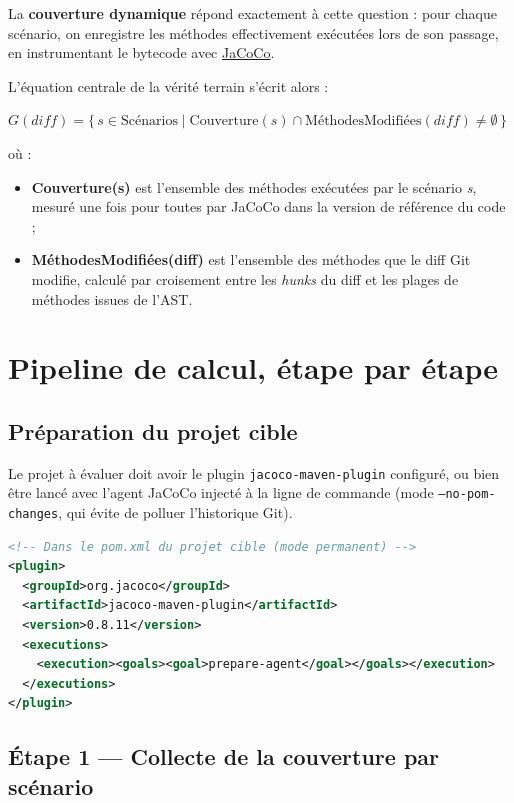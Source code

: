 \documentclass[11pt,a4paper]{article}
\begin{document}
La \textbf{couverture dynamique} répond exactement à cette question : pour chaque scénario, on enregistre les méthodes effectivement exécutées lors de son passage, en instrumentant le bytecode avec \href{https://www.jacoco.org/}{JaCoCo}.

L'équation centrale de la vérité terrain s'écrit alors :

\begin{formulabox}
$G(\mathit{diff}) = \{\, s \in \text{Scénarios} \mid \text{Couverture}(s) \cap \text{MéthodesModifiées}(\mathit{diff}) \neq \emptyset \,\}$
\end{formulabox}

\noindent où :
\begin{itemize}
  \item \textbf{Couverture(s)} est l'ensemble des méthodes exécutées par le scénario \emph{s}, mesuré une fois pour toutes par JaCoCo dans la version de référence du code ;
  \item \textbf{MéthodesModifiées(diff)} est l'ensemble des méthodes que le diff Git modifie, calculé par croisement entre les \emph{hunks} du diff et les plages de méthodes issues de l'AST.
\end{itemize}


\section{Pipeline de calcul, étape par étape}
\label{sec:pipeline}

\subsection{Préparation du projet cible}

Le projet à évaluer doit avoir le plugin \texttt{jacoco-maven-plugin} configuré, ou bien être lancé avec l'agent JaCoCo injecté à la ligne de commande (mode \texttt{--no-pom-changes}, qui évite de polluer l'historique Git).

\begin{lstlisting}[language=XML]
<!-- Dans le pom.xml du projet cible (mode permanent) -->
<plugin>
  <groupId>org.jacoco</groupId>
  <artifactId>jacoco-maven-plugin</artifactId>
  <version>0.8.11</version>
  <executions>
    <execution><goals><goal>prepare-agent</goal></goals></execution>
  </executions>
</plugin>
\end{lstlisting}

\subsection{Étape 1 --- Collecte de la couverture par scénario}
\end{document}
